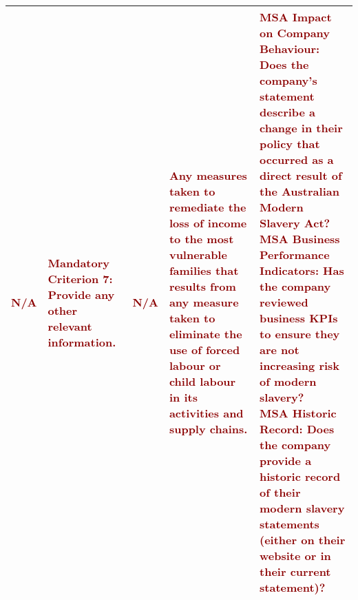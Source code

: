 \begin{landscape}
\begin{table}
\begin{adjustbox}{scale=0.93}
\begin{tabularx}{26cm}{|X|X|X|X|X|}
         \textcolor{darkred}{N/A} & \textcolor{darkred}{Mandatory Criterion 7: Provide any other relevant information.} & \textcolor{darkred}{N/A} & \textcolor{darkred}{Any measures taken to remediate the loss of income to the most vulnerable families that results from any measure taken to eliminate the use of forced labour or child labour in its activities and supply chains.} & \textcolor{darkred}{MSA Impact on Company Behaviour: Does the company’s statement describe a change in their policy that occurred as a direct result of the Australian Modern Slavery Act? \newline MSA Business Performance Indicators: Has the company reviewed business KPIs to ensure they are not increasing risk of modern slavery? \newline MSA Historic Record: Does the company provide a historic record of their modern slavery statements (either on their website or in their current statement)?} \\
    \hline  %
    \end{tabularx}
\end{adjustbox}
\end{table}
\end{landscape}


